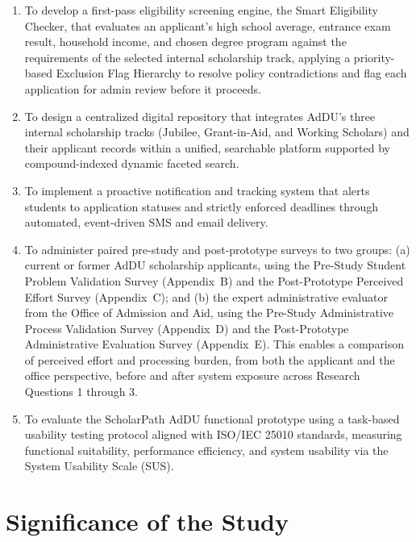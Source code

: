 \begin{enumerate}
  \item To develop a first-pass eligibility screening engine, the Smart Eligibility Checker, that evaluates an applicant's high school average, entrance exam result, household income, and chosen degree program against the requirements of the selected internal scholarship track, applying a priority-based Exclusion Flag Hierarchy to resolve policy contradictions and flag each application for admin review before it proceeds.
  \item To design a centralized digital repository that integrates AdDU's three internal scholarship tracks (Jubilee, Grant-in-Aid, and Working Scholars) and their applicant records within a unified, searchable platform supported by compound-indexed dynamic faceted search.
  \item To implement a proactive notification and tracking system that alerts students to application statuses and strictly enforced deadlines through automated, event-driven SMS and email delivery.
  \item To administer paired pre-study and post-prototype surveys to two
groups: (a) current or former AdDU scholarship applicants, using the
Pre-Study Student Problem Validation Survey (Appendix~B) and the
Post-Prototype Perceived Effort Survey (Appendix~C); and (b) the expert
administrative evaluator from the Office of Admission and Aid, using the
Pre-Study Administrative Process Validation Survey (Appendix~D) and the
Post-Prototype Administrative Evaluation Survey (Appendix~E). This
enables a comparison of perceived effort and processing burden, from
both the applicant and the office perspective, before and after system
exposure across Research Questions 1 through 3.
  \item To evaluate the ScholarPath AdDU functional prototype using a task-based usability testing protocol aligned with ISO/IEC 25010 standards, measuring functional suitability, performance efficiency, and system usability via the System Usability Scale (SUS).
\end{enumerate}

\section{Significance of the Study}

